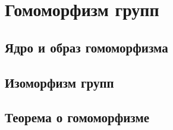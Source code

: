 \section{Гомоморфизм групп}
\subsection{Ядро и образ гомоморфизма}

\subsection{Изоморфизм групп}
\subsection{Теорема о гомоморфизме}
